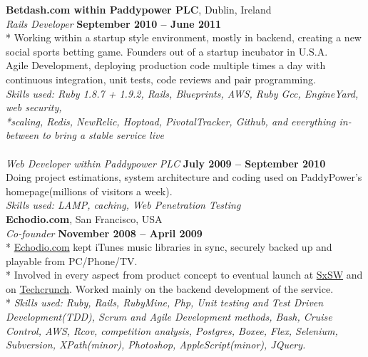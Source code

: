 \documentclass[margin,line]{resume}
\begin{document}
\begin{resume}
    \textbf{Betdash.com within Paddypower PLC}, Dublin, Ireland \vspace{2mm}\\\vspace{1mm}%
    \textsl{Rails Developer} \hfill \textbf{September 2010 -- June 2011}\\*
    Working within a startup style environment, mostly in backend, creating a new social sports betting game. Founders out of a startup incubator in U.S.A. \vspace{1mm}\\%
    Agile Development, deploying production code multiple times a day with continuous integration, unit tests, code reviews and pair programming. \vspace{1mm} \vspace{1mm}\\%
    \textsl{Skills used: Ruby 1.8.7 + 1.9.2, Rails, Blueprints, AWS, Ruby Gcc, EngineYard, web security, \\*scaling, Redis, NewRelic, Hoptoad, PivotalTracker, Github, and everything in-between to bring a stable service live  } \vspace{1mm} \\
    \\ \textsl{Web Developer within Paddypower PLC} \hfill \textbf{July 2009 -- September 2010}\\
    Doing project estimations, system architecture and coding used on PaddyPower's homepage(millions of visitors a week). \vspace{1mm}\\%
    \textsl{Skills used: LAMP, caching, Web Penetration Testing } \vspace{1mm}\\%

    \textbf{Echodio.com}, San Francisco, USA \vspace{2mm}\\\vspace{1mm}%
    \textsl{Co-founder} \hfill \textbf{November 2008 -- April 2009}\\*
    \href{http://echodio.com}{Echodio.com} kept iTunes music libraries in sync, securely backed up and playable from PC/Phone/TV. \\*
    Involved in every aspect from product concept to eventual launch at \href{http://sxsw.com/about/history}{SxSW} and on \href{http://techcrunch.com/2009/03/17/echodio-lets-you-sync-your-itunes-to-the-cloud-300-invites/}{Techcrunch}. Worked mainly on the backend development of the service. \\*
    \textsl{Skills used: Ruby, Rails, RubyMine, Php, Unit testing and Test Driven Development(TDD), Scrum and Agile Development methods, Bash, Cruise Control, AWS, Rcov, competition analysis, Postgres, Boxee, Flex, Selenium, Subversion, XPath(minor), Photoshop, AppleScript(minor), JQuery. } \vspace{1mm}\\%


\end{resume}
\end{document}
